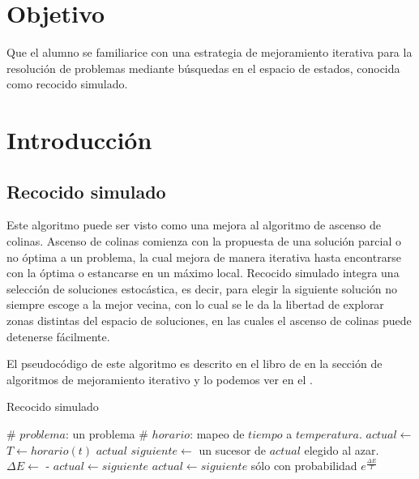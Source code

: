 \section{Objetivo}

Que el alumno se familiarice con una estrategia de mejoramiento iterativa para la resolución de problemas mediante búsquedas en el espacio de estados, conocida como recocido simulado.



\section{Introducción}

\subsection{Recocido simulado}

Este algoritmo puede ser visto como una mejora al algoritmo de ascenso de colinas.  Ascenso de colinas comienza con la propuesta de una solución parcial o no óptima a un problema, la cual mejora de manera iterativa hasta encontrarse con la óptima o estancarse en un máximo local.  Recocido simulado integra una selección de soluciones estocástica, es decir, para elegir la siguiente solución no siempre escoge a la mejor vecina, con lo cual se le da la libertad de explorar zonas distintas del espacio de soluciones, en las cuales el ascenso de colinas puede detenerse fácilmente.

El pseudocódigo de este algoritmo es descrito en el libro de  \cite{Russell2010} en la sección de algoritmos de mejoramiento iterativo y lo podemos ver en el .

\begin{algorithm}
 \caption{Recocido simulado}\label{alg:annealing}
 \begin{algorithmic}
    \State \# $problema$: un problema
    \State \# $horario$: mapeo de $tiempo$ a $temperatura$.
    \State $actual \leftarrow $ 
      \State $T \leftarrow horario(t)$
        \State \Return $actual$
      \EndIf
      \State $siguiente \leftarrow$ un sucesor de $actual$ elegido al azar.
      \State $\Delta E \leftarrow$  - 
        \State $actual \leftarrow siguiente$
      \Else
        \State $actual \leftarrow siguiente$ sólo con probabilidad $e^{\frac{\Delta E}{T}}$
      \EndIf
    \EndFor
  \EndFunction
 \end{algorithmic}
\end{algorithm}



